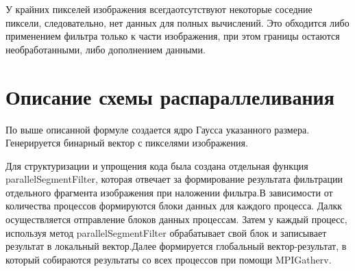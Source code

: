 \documentclass{report}
\begin{document}
\par  У крайних пикселей изображения всегдаотсутствуют некоторые соседние пиксели, следовательно, нет данных для полных вычислений. Это обходится либо применением фильтра только к части изображения, при этом границы остаются необработанными, либо дополнением данными.
\newpage

\section*{Описание схемы распараллеливания}
\par По выше описанной формуле создается ядро Гаусса указанного размера. Генерируется бинарный вектор с пикселями изображения.\par Для структуризации и упрощения кода была создана отдельная функция parallelSegmentFilter, которая отвечает за формирование результата фильтрации отдельного фрагмента изображения при наложении фильтра.В зависимости от количества процессов формируются блоки данных для каждого процесса. Далкк осуществляется отправление блоков данных процессам. Затем у каждый процесс, используя метод  parallelSegmentFilter обрабатывает свой блок и записывает результат в локальный вектор.Далее формируется глобальный вектор-результат, в который собираются результаты со всех процессов при помощи MPIGatherv. 

\newpage
\end{document}
